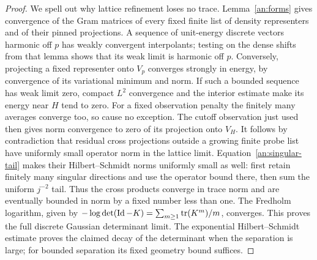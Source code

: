\begin{proof}
We spell out why lattice refinement loses no
trace.  Lemma~\ref{an:forms} gives convergence
of the Gram matrices of every fixed finite
list of density representers and of their
pinned projections.  A sequence of unit-energy
discrete vectors harmonic off $p$ has weakly
convergent interpolants; testing on the dense
shifts from that lemma shows that its weak
limit is harmonic off $p$.  Conversely,
projecting a fixed representer onto $V_p$
converges strongly in energy, by convergence
of its variational minimum and norm.  If such
a bounded sequence has weak limit zero,
compact $L^2$ convergence and the interior
estimate make its energy near $H$ tend to
zero.  For a fixed observation penalty the finitely many
averages converge too, so cause no exception.
The cutoff observation just used then gives
norm convergence to zero of its projection
onto $V_H$.  It follows by contradiction
that residual cross projections outside a
growing finite probe list have uniformly
small operator norm in the lattice limit.
Equation~\eqref{an:singular-tail} makes
their Hilbert--Schmidt norms uniformly small
as well: first retain finitely many singular
directions and use the operator bound there,
then sum the uniform $j^{-2}$ tail.
Thus the cross products converge in trace
norm and are eventually bounded in norm by
a fixed number less than one.  The
Fredholm logarithm, given by
$-\log\det(\operatorname{Id}-K)=\sum_{m\ge1}\operatorname{tr}(K^m)/m$,
converges.  This proves the full discrete
Gaussian determinant limit.  The exponential
Hilbert--Schmidt estimate proves the claimed
decay of the determinant when the separation
is large; for bounded separation its fixed
geometry bound suffices.


\end{proof}
